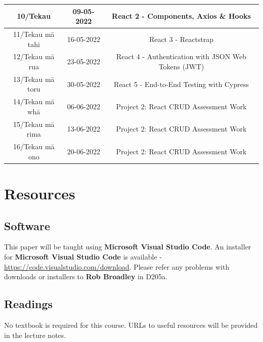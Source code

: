 \documentclass{article}
\begin{document}
\begin{tabular}{|c|c|c|c|}
	\footnotesize 10/Tekau         & \footnotesize 09-05-2022 & \multicolumn{2}{c|}{\footnotesize React 2 - Components, Axios \& Hooks}                                                          \\ \hline
	\footnotesize 11/Tekau mā tahi & \footnotesize 16-05-2022 & \multicolumn{2}{c|}{\footnotesize React 3 - Reactstrap}                                                                          \\ \hline
	\footnotesize 12/Tekau mā rua  & \footnotesize 23-05-2022 & \multicolumn{2}{c|}{\footnotesize React 4 - Authentication with JSON Web Tokens (JWT)}                                           \\ \hline
	\footnotesize 13/Tekau mā toru & \footnotesize 30-05-2022 & \multicolumn{2}{c|}{\footnotesize React 5 - End-to-End Testing with Cypress}                                                     \\ \hline
	\footnotesize 14/Tekau mā whā  & \footnotesize 06-06-2022 & \multicolumn{2}{c|}{\footnotesize Project 2: React CRUD Assessment Work}                                                         \\ \hline
	\footnotesize 15/Tekau mā rima & \footnotesize 13-06-2022 & \multicolumn{2}{c|}{\footnotesize Project 2: React CRUD Assessment Work}                                                         \\ \hline
	\footnotesize 16/Tekau mā ono  & \footnotesize 20-06-2022 & \multicolumn{2}{c|}{\footnotesize Project 2: React CRUD Assessment  Work}                                                        \\ \hline
\end{tabular}

\section*{Resources}

\subsection*{Software}
This paper will be taught using \textbf{Microsoft Visual Studio Code}. An installer for \textbf{Microsoft Visual Studio Code} is available - \href{https://code.visualstudio.com/download}{https://code.visualstudio.com/download}. Please refer any problems with downloads or installers to \textbf{Rob Broadley} in D205a.

\subsection*{Readings}
No textbook is required for this course. URLs to useful resources will be provided in the lecture notes.
\end{document}
